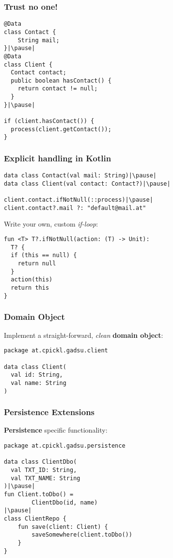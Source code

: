 

  

\begin{frame}[fragile] \frametitle{Trust no one!}
\begin{lstlisting}
@Data
class Contact {
    String mail;
}|\pause|
@Data
class Client {
  Contact contact;
  public boolean hasContact() {
    return contact != null;
  }
}|\pause|

if (client.hasContact()) {
  process(client.getContact());
}
\end{lstlisting}
\end{frame}

\begin{frame}[fragile] \frametitle{Explicit handling in Kotlin}
\begin{lstlisting}
data class Contact(val mail: String)|\pause|
data class Client(val contact: Contact?)|\pause|

client.contact.ifNotNull(::process)|\pause|
client.contact?.mail ?: "default@mail.at"
\end{lstlisting}
\pause
Write your own, custom \textit{if-loop}:
\begin{lstlisting}
fun <T> T?.ifNotNull(action: (T) -> Unit): 
  T? {
  if (this == null) {
    return null
  }
  action(this)
  return this
}
\end{lstlisting}
\end{frame}


\begin{frame}[fragile] \frametitle{Domain Object}
Implement a straight-forward, \textit{clean} \textbf{domain object}:
\begin{lstlisting}
package at.cpickl.gadsu.client

data class Client(
  val id: String,
  val name: String
)
\end{lstlisting}
\end{frame}

\begin{frame}[fragile] \frametitle{Persistence Extensions}
\textbf{Persistence} specific functionality:
\begin{lstlisting}
package at.cpickl.gadsu.persistence

data class ClientDbo(
  val TXT_ID: String,
  val TXT_NAME: String
)|\pause|
fun Client.toDbo() =
        ClientDbo(id, name)
|\pause|
class ClientRepo {
    fun save(client: Client) {
        saveSomewhere(client.toDbo())
    }
}
\end{lstlisting}
\end{frame}

